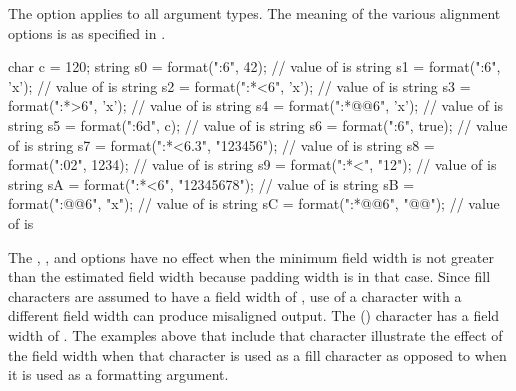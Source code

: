\pnum
The  option applies to all argument types.
The meaning of the various alignment options is as specified in .
\begin{example}
\begin{codeblock}
char c = 120;
string s0 = format("{:6}", 42);             // value of  is 
string s1 = format("{:6}", 'x');            // value of  is 
string s2 = format("{:*<6}", 'x');          // value of  is 
string s3 = format("{:*>6}", 'x');          // value of  is 
string s4 = format("{:*@\caret{}@6}", 'x');          // value of  is 
string s5 = format("{:6d}", c);             // value of  is 
string s6 = format("{:6}", true);           // value of  is 
string s7 = format("{:*<6.3}", "123456");   // value of  is 
string s8 = format("{:02}", 1234);          // value of  is 
string s9 = format("{:*<}", "12");          // value of  is 
string sA = format("{:*<6}", "12345678");   // value of  is 
string sB = format("{:@\kern0.75pt\caret{}@6}", "x");         // value of  is 
string sC = format("{:*@\caret{}@6}", "@\kern0.75pt\kern0.75pt\kern0.75pt@");     // value of  is 
\end{codeblock}
\end{example}
\begin{note}
The , , and  options
have no effect when the minimum field width
is not greater than the estimated field width
because padding width is  in that case.
Since fill characters are assumed to have a field width of ,
use of a character with a different field width can produce misaligned output.
The  () character has a field width of .
The examples above that include that character
illustrate the effect of the field width
when that character is used as a fill character
as opposed to when it is used as a formatting argument.
\end{note}

